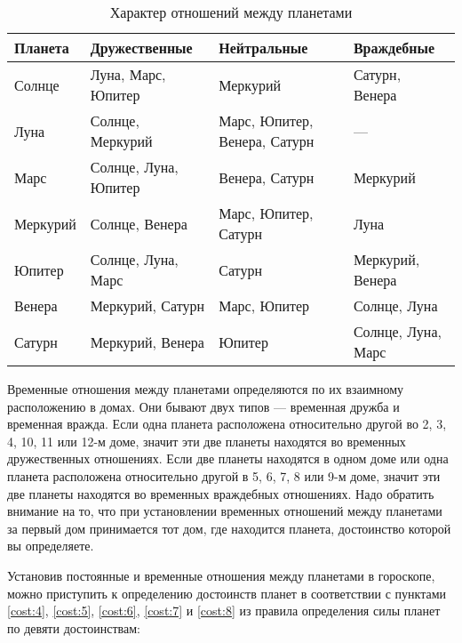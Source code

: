 \begin{table}[tph!]
	\caption{Характер отношений между планетами}
	\label{tbl:relations}

	\centering

	\renewcommand{\arraystretch}{1}


	\begin{tabular}{|l|l|l|l|}
		\hline
		Планета & Дружественные & Нейтральные & Враждебные \\
		\hline
		Солнце   & Луна, Марс, Юпитер & Меркурий & Сатурн, Венера \\
		Луна     & Солнце, Меркурий & Марс, Юпитер, Венера, Сатурн & --- \\
		Марс     & Солнце, Луна, Юпитер & Венера, Сатурн & Меркурий \\
		Меркурий & Солнце, Венера & Марс, Юпитер, Сатурн & Луна \\
		Юпитер   & Солнце, Луна, Марс & Сатурн & Меркурий, Венера \\
		Венера   & Меркурий, Сатурн & Марс, Юпитер & Солнце, Луна \\
		Сатурн   & Меркурий, Венера & Юпитер & Солнце, Луна, Марс \\
		\hline
	\end{tabular}
\end{table}

Временные отношения между планетами определяются по их взаимному расположению в домах. Они бывают двух типов --- временная дружба и временная вражда. Если одна планета расположена относительно другой во 2, 3, 4, 10, 11 или 12-м доме, значит эти две планеты находятся во временных дружественных отношениях. Если две планеты находятся в одном доме или одна планета расположена относительно другой в 5, 6, 7, 8 или 9-м доме, значит эти две планеты находятся во временных враждебных отношениях. Надо обратить внимание на то, что при установлении временных отношений между планетами за первый дом принимается тот дом, где находится планета, достоинство которой вы определяете.

Установив постоянные и временные отношения между планетами в гороскопе, можно приступить к определению достоинств планет в соответствии с пунктами \ref{cost:4}, \ref{cost:5}, \ref{cost:6}, \ref{cost:7} и \ref{cost:8} из правила определения силы планет по девяти достоинствам:


